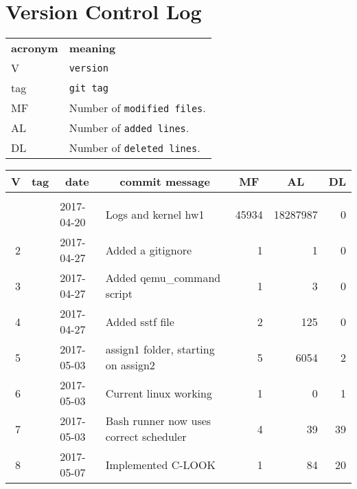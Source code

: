\documentclass[letterpaper,10pt,titlepage, onecolumn, compsoc]{IEEEtran}
\begin{document}
\section{Version Control Log}
\begin{tabular}{lp{12cm}}
  \label{tabular:legend:git-log}
  \textbf{acronym} & \textbf{meaning} \\
  V & \texttt{version} \\
  tag & \texttt{git tag} \\
  MF & Number of \texttt{modified files}. \\
  AL & Number of \texttt{added lines}. \\
  DL & Number of \texttt{deleted lines}. \\
\end{tabular}

\bigskip

\begin{longtable}{|rlllrrr|}
\hline \multicolumn{1}{|c}{\textbf{V}} & \multicolumn{1}{c}{\textbf{tag}}
& \multicolumn{1}{c}{\textbf{date}}
& \multicolumn{1}{c}{\textbf{commit message}} & \multicolumn{1}{c}{\textbf{MF}}
& \multicolumn{1}{c}{\textbf{AL}} & \multicolumn{1}{c|}{\textbf{DL}} \\ \hline
\endhead

\hline \multicolumn{7}{|r|}{} \\ \hline
\endfoot

\hline%
\endlastfoot

\hline 1 &  & 2017-04-20 & Logs and kernel hw1 & 45934 & 18287987 & 0 \\
\hline 2 &  & 2017-04-27 & Added a gitignore & 1 & 1 & 0 \\
\hline 3 &  & 2017-04-27 & Added qemu\_command script & 1 & 3 & 0 \\
\hline 4 &  & 2017-04-27 & Added sstf file & 2 & 125 & 0 \\
\hline 5 &  & 2017-05-03 & assign1 folder, starting on assign2 & 5 & 6054 & 2 \\
\hline 6 &  & 2017-05-03 & Current linux working & 1 & 0 & 1 \\
\hline 7 &  & 2017-05-03 & Bash runner now uses correct scheduler & 4 & 39 & 39 \\
\hline 8 &  & 2017-05-07 & Implemented C-LOOK & 1 & 84 & 20 \\
\end{longtable}

 
\end{document}
